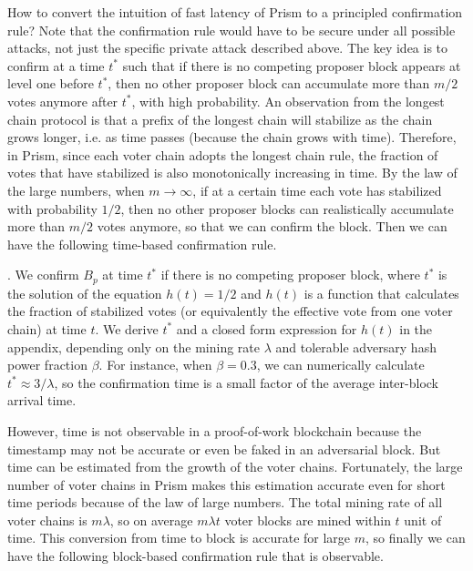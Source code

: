 \documentclass{article}
\begin{document}
 How to convert the intuition of fast latency of {\sf Prism} to a principled confirmation rule? Note that the confirmation rule would have to be secure under all possible attacks, not just the specific private attack described above. 
The key idea is to confirm at a time $t^*$ such that if there is no competing proposer block appears at level one before $t^*$, then no other proposer block can accumulate more than $m/2$ votes anymore after $t^*$, with high probability.
An observation from the longest chain protocol is that a prefix of the longest chain will stabilize as the chain grows longer, i.e. as time passes (because the chain grows with time). 
Therefore, in {\sf Prism}, since each voter chain adopts the longest chain rule, the fraction of votes that have stabilized is also monotonically increasing in time. 
By the law of the large numbers, when $m \rightarrow \infty$, if at a certain time each vote has stabilized with probability $1/2$, then no other 
proposer blocks can realistically accumulate more than $m/2$ votes anymore, so that we can confirm the block. Then we can have the following time-based confirmation rule.


.  We confirm $B_p$ at time $t^*$ if there is no competing proposer block, where $t^*$ is the solution of the equation $h(t) = 1/2$ and $h(t)$ is a function that calculates the fraction of stabilized votes (or equivalently the effective vote from one voter chain) at time $t$. We derive $t^*$ and a closed form expression for $h(t)$ in the appendix, depending only on the mining rate $\lambda$ and tolerable adversary hash power fraction  $\beta$.   For instance, when $\beta = 0.3$, we can numerically calculate $t^* \approx 3/\lambda$, so the confirmation time is a small factor of the average inter-block arrival time. 


However, time is not observable in a proof-of-work blockchain because the timestamp may not be accurate or even be faked in an adversarial block. But time can be estimated from the growth of the voter chains. Fortunately, the large number of voter chains in {\sf Prism} makes this estimation accurate even for short time periods because of the law of large numbers. The total mining rate of all voter chains is $m\lambda$, so on average $m\lambda t$ voter blocks are mined within $t$ unit of time. This conversion from time to block is accurate for large $m$, so finally we can have the following block-based confirmation rule that is observable.
\end{document}
